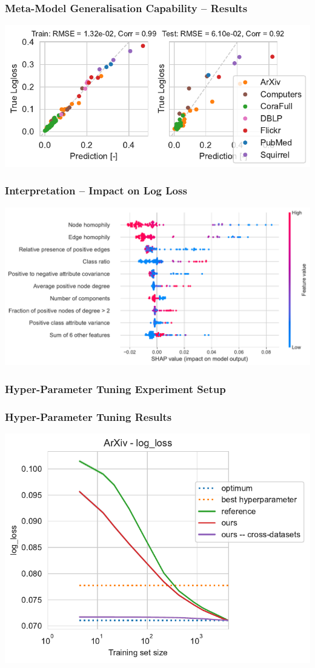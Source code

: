 \documentclass[10pt, 169]{beamer}
\begin{document}
\begin{frame}
	\frametitle{Meta-Model Generalisation Capability -- Results}
	\scalebox{0.9} {\includegraphics{images/gnn_random_split_prec_logloss.pdf}}
\end{frame}

\begin{frame}
	\frametitle{Interpretation -- Impact on Log Loss}
	\scalebox{1} {\includegraphics[width=0.9\linewidth]{images/shap_logloss.pdf}}
\end{frame}

\begin{frame}
	\frametitle{Hyper-Parameter Tuning Experiment Setup}
	
\end{frame}

\begin{frame}
	\frametitle{Hyper-Parameter Tuning Results}
	\scalebox{1} {\includegraphics[width=0.7\linewidth]{images/hyperpar_tuning_small_single.pdf}}
\end{frame}
\end{document}
